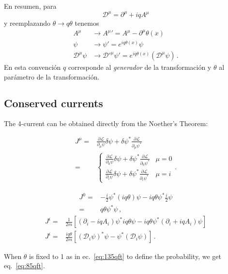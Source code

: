 En resumen, para 
\begin{equation}
  \mathcal{D}^\mu=\partial^\mu+iqA^\mu
\end{equation}
y reemplazando $\theta\to q\theta$ tenemos
\begin{align}
   A^\mu&\to{A^\mu}'=A^\mu-\partial^\mu\theta(x)\nonumber\\
   \psi&\to \psi'=e^{iq\theta(x)}\psi\nonumber\\
  \mathcal{D}^\mu\psi&\to {\mathcal{D}'}^\mu\psi'=e^{iq\theta(x)}(\mathcal{D}^\mu\psi)\,.
\end{align}
En esta convención $q$ corresponde al \emph{generador} de la transformación y $\theta$ al parámetro de la transformación.


\subsection{Conserved currents}
The 4-current can be obtained directly from the Noether's Theorem:

\begin{align}
  J^\mu=&\frac{\partial\mathcal{L}}{\partial_\mu\psi}\delta\psi+\delta\psi^*\frac{\partial\mathcal{L}}{\partial_\mu\psi^*}\nonumber\\
=&\begin{cases}
  \frac{\partial\mathcal{L}}{\partial_0\psi}\delta\psi+\delta\psi^*\frac{\partial\mathcal{L}}{\partial_0\psi^*}&\mu=0\\
  \frac{\partial\mathcal{L}}{\partial_i\psi}\delta\psi+\delta\psi^*\frac{\partial\mathcal{L}}{\partial_i\psi^*}&\mu=i
\end{cases}.
\end{align}

\begin{align}
  J^0=&-\frac{i}{2}\psi^*(iq\theta)\psi-iq\theta\psi^*\frac{i}{2}\psi\nonumber\\
  =&q\theta\psi^*\psi\,,
\end{align}
\begin{align}
  J^i=&\frac{1}{2m}\left[\left(\partial_i-iqA_i\right)\psi^*iq\theta\psi-iq\theta\psi^*\left(\partial_i+iqA_i\right)\psi\right]\nonumber\\
  J^i=&\frac{iq\theta}{2m}\left[\left(\mathcal{D}_i\psi\right)^*\psi-\psi^*\left(\mathcal{D}_i\psi\right)\right]\,.
  \end{align}

When $\theta$ is fixed to 1 as in ec.~\eqref{eq:135qft} to define the probability, we get eq.~\eqref{eq:85qft}.

